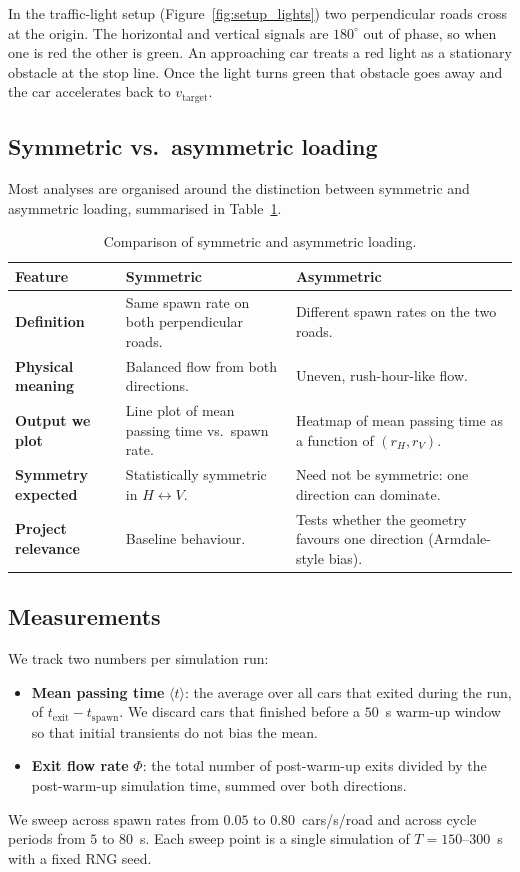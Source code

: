 \documentclass[11pt]{article}
\begin{document}
In the traffic-light setup (Figure~\ref{fig:setup_lights}) two perpendicular roads cross at the origin. The horizontal and vertical signals are $180^{\circ}$ out of phase, so when one is red the other is green. An approaching car treats a red light as a stationary obstacle at the stop line. Once the light turns green that obstacle goes away and the car accelerates back to $v_{\text{target}}$.

\subsection{Symmetric vs.\ asymmetric loading}
Most analyses are organised around the distinction between symmetric and asymmetric loading, summarised in Table~\ref{tab:symmetric_asymmetric}.

\begin{table}[H]
\centering
\small
\begin{tabular}{|p{2.4cm}|p{6.0cm}|p{6.0cm}|}
\hline
\textbf{Feature} & \textbf{Symmetric} & \textbf{Asymmetric} \\ \hline
\textbf{Definition} & Same spawn rate on both perpendicular roads. & Different spawn rates on the two roads. \\ \hline
\textbf{Physical meaning} & Balanced flow from both directions. & Uneven, rush-hour-like flow. \\ \hline
\textbf{Output we plot} & Line plot of mean passing time vs.\ spawn rate. & Heatmap of mean passing time as a function of $(r_H, r_V)$. \\ \hline
\textbf{Symmetry expected} & Statistically symmetric in $H \leftrightarrow V$. & Need not be symmetric: one direction can dominate. \\ \hline
\textbf{Project relevance} & Baseline behaviour. & Tests whether the geometry favours one direction (Armdale-style bias). \\ \hline
\end{tabular}
\caption{Comparison of symmetric and asymmetric loading.}
\label{tab:symmetric_asymmetric}
\end{table}

\subsection{Measurements}
We track two numbers per simulation run:
\begin{itemize}
    \item \textbf{Mean passing time} $\langle t \rangle$: the average over all cars that exited during the run, of $t_{\text{exit}} - t_{\text{spawn}}$. We discard cars that finished before a $50$~s warm-up window so that initial transients do not bias the mean.
    \item \textbf{Exit flow rate} $\Phi$: the total number of post-warm-up exits divided by the post-warm-up simulation time, summed over both directions.
\end{itemize}
We sweep across spawn rates from $0.05$ to $0.80$~cars/s/road and across cycle periods from $5$ to $80$~s. Each sweep point is a single simulation of $T = 150$--$300$~s with a fixed RNG seed.
\end{document}
